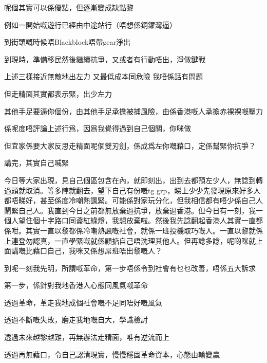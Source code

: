 呢個其實可以係優點，但逐漸變成缺點黎

例如一開始嘅遊行已經由中途站行（唔想係銅鑼灣逼）

到街頭嘅時候唔Blackblock唔帶gear淨出

到現時，準備移民然後繼續抗爭，又或者有行動唔出，淨做鍵戰

上述三樣接近無敵地出左力 又最低成本同危險 我唔係話有問題

但走精面其實都表示緊，出少左力

其他手足要逼你個份，由其他手足承擔被捕風險，由係香港嘅人承擔赤裸裸嘅壓力

係呢度唔評論上述行爲，因爲我覺得過到自己個關，你咪做

但宜家係要大家反思走精面呢個雙刃劍，係成爲左你嘅藉口，定係幫緊你抗爭？

講完，其實自己喊緊

今日等大家出現，見自己個區包含在內，就即刻出，出到去都預左少人，無諗到轉過頭就取消。等多陣就翻去，望下自己有份嘅tg grp，睇上少少先發現原來好多人都唔睇好，甚至係度冷嘲熱諷緊。可能係對家玩分化，但我相信都有唔少係自己人鬧緊自己人。我直到今日之前都無放棄過抗爭，放棄過香港。但今日有一刻，我一個人望住個十字路口同盞紅綠燈，我想放棄啦。然後我先諗翻起香港人其實一直都係咁。其實一直以黎都係冷嘲熱諷嘅社會，就係一班投機取巧嘅人。一直以黎就係上連登勿認真，一直學緊嘅就係顧掂自己唔洗理其他人。但再諗多諗，呢啲咪就上面講嘅比藉口自己，我咪又係想屌班唔出黎嘅人？

到呢一刻我先明，所謂嘅革命，第一步唔係令到社會有乜乜改善，唔係五大訴求

第一步，係針對我地香港人心態同風氣嘅革命

透過革命，革走我地成個社會嘅不足同唔好嘅風氣

透過不斷嘅失敗，磨走我地嘅自大，學識檢討

透過未來越黎越難，再無辦法走精面，唯有逆流而上

透過再無藉口，令自己認清現實，慢慢穩固革命資本，心態由輸變贏

